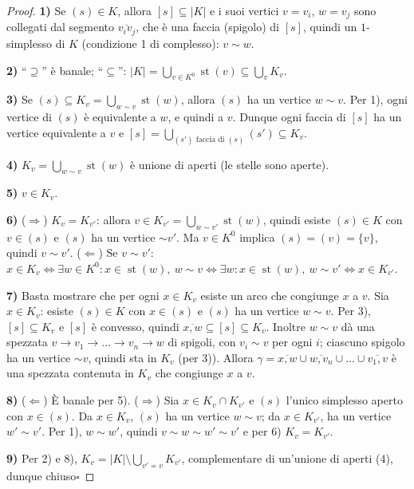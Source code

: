 \begin{proof}
\textbf{1)} Se $(s) \in K$, allora $[s] \subseteq |K|$ e i suoi vertici $v = v_i$, $w = v_j$ sono collegati dal segmento $\overline{v_i v_j}$, che \`e una faccia (spigolo) di $[s]$, quindi un $1$-simplesso di $K$ (condizione 1 di complesso): $v \sim w$.

\textbf{2)} ``$\supseteq$'' \`e banale; ``$\subseteq$'': $|K| = \bigcup_{v \in K^0} \operatorname{st}(v) \subseteq \bigcup_{v} K_v$.

\textbf{3)} Se $(s) \subseteq K_v = \bigcup_{w \sim v} \operatorname{st}(w)$, allora $(s)$ ha un vertice $w \sim v$. Per 1), ogni vertice di $(s)$ \`e equivalente a $w$, e quindi a $v$. Dunque ogni faccia di $[s]$ ha un vertice equivalente a $v$ e $[s] = \bigcup_{(s') \text{ faccia di } (s)} (s') \subseteq K_v$.

\textbf{4)} $K_v = \bigcup_{w \sim v} \operatorname{st}(w)$ \`e unione di aperti (le stelle sono aperte).

\textbf{5)} $v \in K_v$.

\textbf{6)} ($\Rightarrow$) $K_v = K_{v'}$: allora $v \in K_{v'} = \bigcup_{w \sim v'} \operatorname{st}(w)$, quindi esiste $(s) \in K$ con $v \in (s)$ e $(s)$ ha un vertice $\sim v'$. Ma $v \in K^0$ implica $(s) = (v) = \{v\}$, quindi $v \sim v'$. ($\Leftarrow$) Se $v \sim v'$: $x \in K_v \iff \exists w \in K^0: x \in \operatorname{st}(w),\ w \sim v \iff \exists w: x \in \operatorname{st}(w),\ w \sim v' \iff x \in K_{v'}$.

\textbf{7)} Basta mostrare che per ogni $x \in K_v$ esiste un arco che congiunge $x$ a $v$. Sia $x \in K_v$: esiste $(s) \in K$ con $x \in (s)$ e $(s)$ ha un vertice $w \sim v$. Per 3), $[s] \subseteq K_v$ e $[s]$ \`e convesso, quindi $\overline{x, w} \subseteq [s] \subseteq K_v$. Inoltre $w \sim v$ d\`a una spezzata $v \to v_1 \to \dots \to v_n \to w$ di spigoli, con $v_i \sim v$ per ogni $i$; ciascuno spigolo ha un vertice $\sim v$, quindi sta in $K_v$ (per 3)). Allora $\gamma = \overline{x, w} \cup \overline{w, v_n} \cup \dots \cup \overline{v_1, v}$ \`e una spezzata contenuta in $K_v$ che congiunge $x$ a $v$.

\textbf{8)} ($\Leftarrow$) \`E banale per 5). ($\Rightarrow$) Sia $x \in K_v \cap K_{v'}$ e $(s)$ l'unico simplesso aperto con $x \in (s)$. Da $x \in K_v$, $(s)$ ha un vertice $w \sim v$; da $x \in K_{v'}$, ha un vertice $w' \sim v'$. Per 1), $w \sim w'$, quindi $v \sim w \sim w' \sim v'$ e per 6) $K_v = K_{v'}$.

\textbf{9)} Per 2) e 8), $K_v = |K| \setminus \bigcup_{v' \not\sim v} K_{v'}$, complementare di un'unione di aperti (4), dunque chiuso\hfill$\square$
\end{proof}

